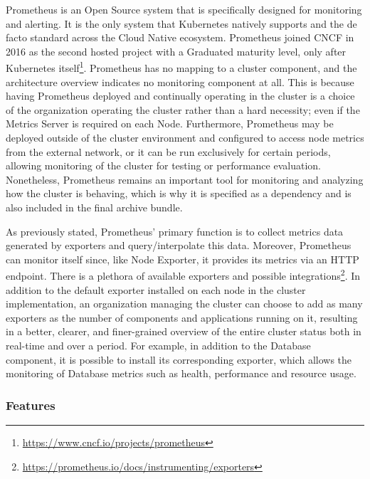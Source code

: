 Prometheus is an Open Source system that is specifically designed for monitoring
and alerting. It is the only system that Kubernetes natively supports and the de
facto standard across the Cloud Native ecosystem\cite{prometheus_overview_faq}.
Prometheus joined CNCF in 2016 as the second hosted project with a Graduated
maturity level, only after Kubernetes itself\footnote{\url{https://www.cncf.io/projects/prometheus}}\cite{prometheus_overview}.
Prometheus has no mapping to a cluster component, and the architecture overview
indicates no monitoring component at all. This is because having Prometheus deployed
and continually operating in the cluster is a choice of the organization operating
the cluster rather than a hard necessity; even if the Metrics Server is required
on each Node. Furthermore, Prometheus may be deployed outside of the cluster
environment and configured to access node metrics from the external network, or it
can be run exclusively for certain periods, allowing monitoring of the cluster
for testing or performance evaluation. Nonetheless, Prometheus remains an
important tool for monitoring and analyzing how the cluster is behaving, which is
why it is specified as a dependency and is also included in the final archive bundle.

As previously stated, Prometheus' primary function is to collect metrics data generated
by exporters and query/interpolate this data. Moreover, Prometheus can monitor itself
since, like Node Exporter, it provides its metrics via an HTTP endpoint. There
is a plethora of available exporters and possible integrations\footnote{\url{https://prometheus.io/docs/instrumenting/exporters}}.
In addition to the default exporter installed on each node in the cluster implementation,
an organization managing the cluster can choose to add as many exporters as the
number of components and applications running on it, resulting in a better,
clearer, and finer-grained overview of the entire cluster status both in real-time
and over a period. For example, in addition to the Database component, it is
possible to install its corresponding exporter, which allows the monitoring of Database
metrics such as health, performance and resource usage.

\subsubsection{Features}
\label{subsubsec:implementation_dependencies_prometheus_features}


